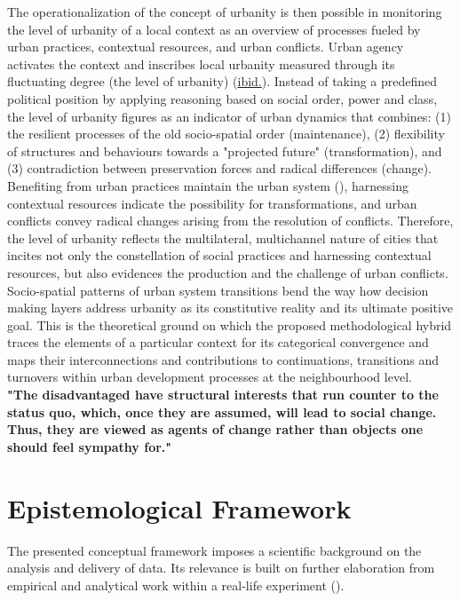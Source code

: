 \documentclass[11pt]{report}
\begin{document}
{{{{The operationalization of the concept of urbanity is then possible in monitoring the level of urbanity of a local context as an overview of processes fueled by urban practices, contextual resources, and urban conflicts.
Urban agency activates the context and inscribes local urbanity measured through its fluctuating degree (the level of urbanity) (\href{Marcus}{ibid.}).
Instead of taking a predefined political position by applying reasoning based on social order, power and class, the level of urbanity figures as an indicator of urban dynamics that combines:
(1) the resilient processes of the old socio-spatial order (maintenance),
(2) flexibility of structures and behaviours towards a "projected future" (transformation), and
(3) contradiction between preservation forces and radical differences (change).
Benefiting from urban practices maintain the urban system (\href{Taradin}{\citealt{tardin_landscape_2014}}), harnessing contextual resources indicate the possibility for transformations, and urban conflicts convey radical changes arising from the resolution of conflicts. Therefore, the level of urbanity reflects the multilateral, multichannel nature of cities that incites not only the constellation of social practices and harnessing contextual resources, but also evidences the production and the challenge of urban conflicts.
\\

Socio-spatial patterns of urban system transitions bend the way how decision making layers address urbanity as its constitutive reality and its ultimate positive goal.
This is the theoretical ground on which the proposed methodological hybrid traces the elements of a particular context for its categorical convergence and maps their interconnections and contributions to continuations, transitions and turnovers within urban development processes at the neighbourhood level. 
\\

\textbf{"The disadvantaged have structural interests that run counter to the status quo, which, once they are assumed, will lead to social change. Thus, they are viewed as agents of change rather than objects one should feel sympathy for." \citealt{Sears 2008}}

\section{Epistemological Framework}
The presented conceptual framework imposes a scientific background on the analysis and delivery of data.
Its relevance is built on further elaboration from empirical and analytical work within a real-life experiment (\href{Parnell}{\citealt{parnell_retheorizing_2012}}).
\\

}}}}
\end{document}
